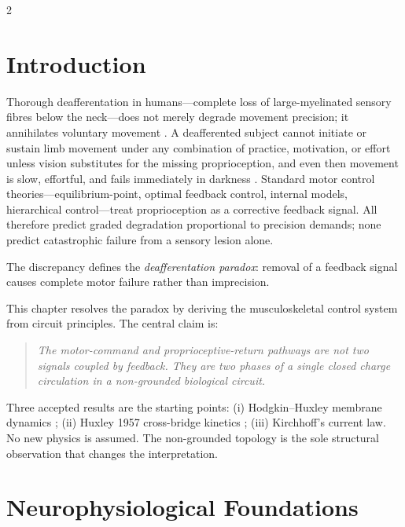 \begin{multicols}{2}

\section{Introduction}
\label{sec:ch06-introduction}

Thorough deafferentation in humans---complete loss of large-myelinated
sensory fibres below the neck---does not merely degrade movement precision; it
annihilates voluntary movement \citep{cole1991,cole2016}.  A deafferented
subject cannot initiate or sustain limb movement under any combination of
practice, motivation, or effort unless vision substitutes for the missing
proprioception, and even then movement is slow, effortful, and fails
immediately in darkness \citep{sainburg1993,sainburg1995,ghez1995,lajoie1996}.
Standard motor control theories---equilibrium-point, optimal feedback control,
internal models, hierarchical control---treat proprioception as a corrective
feedback signal. All therefore predict graded degradation proportional to
precision demands; none predict catastrophic failure from a sensory lesion
alone.

The discrepancy defines the \emph{deafferentation paradox}: removal of a
feedback signal causes complete motor failure rather than imprecision.

This chapter resolves the paradox by deriving the musculoskeletal control
system from circuit principles. The central claim is:
\begin{quote}
  \itshape
  The motor-command and proprioceptive-return pathways are not two signals
  coupled by feedback.  They are two phases of a single closed charge
  circulation in a non-grounded biological circuit.
\end{quote}
Three accepted results are the starting points: (i) Hodgkin--Huxley membrane
dynamics \citep{hodgkin1952}; (ii) Huxley 1957 cross-bridge kinetics
\citep{huxley1957}; (iii) Kirchhoff's current law.  No new physics is
assumed.  The non-grounded topology is the sole structural observation that
changes the interpretation.

\section{Neurophysiological Foundations}
\label{sec:ch06-foundations}


\end{multicols}
